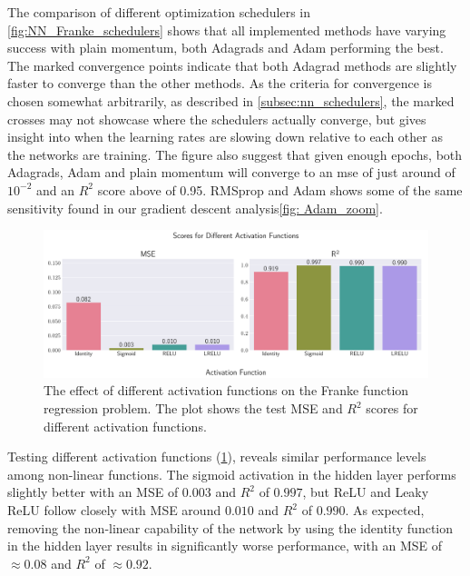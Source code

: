 The comparison of different optimization schedulers in \cref{fig:NN_Franke_schedulers} shows that all implemented methods have varying success with plain momentum, both Adagrads and Adam performing the best. The marked convergence points indicate that both Adagrad methods are slightly faster to converge than the other methods. As the criteria for convergence is chosen somewhat arbitrarily, as described in \cref{subsec:nn_schedulers}, the marked crosses may not showcase where the schedulers actually converge, but gives insight into when the learning rates are slowing down relative to each other as the networks are training. The figure also suggest that given enough epochs, both Adagrads, Adam and plain momentum will converge to an mse of just around of \( 10^{-2} \) and an \( R^2 \) score above of 0.95. RMSprop and Adam shows some of the same sensitivity found in our gradient descent analysis\cref{fig: Adam_zoom}.

\onecolumngrid
\begin{figure}[h!]
    \begin{minipage}{\textwidth}
        \centering
        \includegraphics[width = .9\textwidth]{../figs/c_activation_funcs.pdf}
        \caption{The effect of different activation functions on the Franke function regression problem. The plot shows the test MSE and \( R^2 \) scores for different activation functions.}
        \label{fig:NN_Franke_activation}
    \end{minipage}
\end{figure}
\twocolumngrid

Testing different activation functions (\cref{fig:NN_Franke_activation}), reveals similar performance levels among non-linear functions. The sigmoid activation in the hidden layer performs slightly better with an MSE of $0.003$ and $R^2$ of $0.997$, but ReLU and Leaky ReLU follow closely with MSE around $0.010$ and $R^2$ of $0.990$. As expected, removing the non-linear capability of the network by using the identity function in the hidden layer results in significantly worse performance, with an MSE of $\approx0.08$ and $R^2$ of $\approx0.92$.

